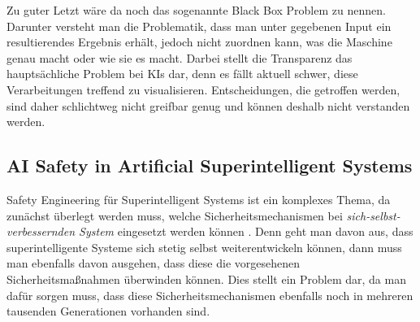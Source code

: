         Zu guter Letzt wäre da noch das sogenannte Black Box Problem zu nennen. Darunter versteht man die Problematik,
        dass man unter gegebenen Input ein resultierendes Ergebnis erhält, jedoch nicht zuordnen kann, was die Maschine
        genau macht oder wie sie es macht. \cite{zednik2019solving} Darbei stellt die Transparenz das hauptsächliche
        Problem bei KIs dar, denn es fällt aktuell schwer, diese Verarbeitungen treffend zu visualisieren. Entscheidungen,
        die getroffen werden, sind daher schlichtweg nicht greifbar genug und können deshalb nicht verstanden werden.

        \subsection{AI Safety in Artificial Superintelligent Systems}

        Safety Engineering für Superintelligent Systems ist ein komplexes Thema, da zunächst überlegt werden muss, welche
        Sicherheitsmechanismen bei \textit{sich-selbst-verbessernden System} eingesetzt werden können \cite[s. 9]{yampolskiy2013safety}.
        Denn geht man davon aus, dass superintelligente Systeme sich stetig selbst weiterentwickeln können, dann muss man
        ebenfalls davon ausgehen, dass diese die vorgesehenen Sicherheitsmaßnahmen überwinden können. Dies stellt ein
        Problem dar, da man dafür sorgen muss, dass diese Sicherheitsmechanismen ebenfalls noch in mehreren tausenden
        Generationen vorhanden sind.

